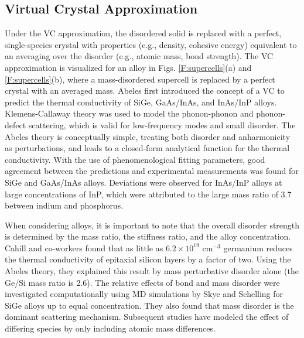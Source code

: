 \documentclass[12pt,twocolumn,iop]{/usr/share/texmf-texlive/tex/latex/iop/iopart}[/usr/share/texmf-texlive/tex/latex/iop/]
\begin{document}

\subsection{\label{S:Virtual Crystal}Virtual Crystal Approximation}

Under the VC approximation, the disordered solid is replaced with 
a perfect, single-species crystal with properties (e.g., density, 
cohesive energy) equivalent to an averaging over the disorder 
(e.g., atomic mass, bond strength).\cite{abeles_lattice_1963}
The VC approximation is visualized for an alloy in Figs. 
\ref{F:supercells}(a) and \ref{F:supercells}(b), where 
a mass-disordered supercell is replaced by a perfect 
crystal with an averaged mass. 
Abeles first introduced the concept of a VC to predict the
thermal conductivity of SiGe, GaAs/InAs, and InAs/InP alloys.
\cite{abeles_lattice_1963} Klemens-Callaway theory was used to model 
the phonon-phonon and phonon-defect scattering, 
which is valid for low-frequency modes and small disorder.
\cite{abeles_lattice_1963,klemens_scattering_1955,
klemens_thermal_1957,callaway_model_1959,mattis_phonon_1957,
kamitakahara_vibrations_1974} 
The Abeles theory is conceptually simple, treating both
disorder and anharmonicity as perturbations, and leads to 
a closed-form analytical function for the thermal conductivity.
With the use of phenomenological  
fitting parameters, good agreement between the predictions and 
experimental measurements 
was found for SiGe and GaAs/InAs alloys. Deviations were observed 
for InAs/InP alloys at large concentrations of 
InP, which were attributed to the large mass ratio of 3.7 between 
indium and phosphorus.\cite{abeles_lattice_1963}

When considering alloys, it is important to note that 
the overall disorder strength is determined by the mass ratio, 
the stiffness ratio, and the alloy concentration.
Cahill and co-workers found that as little as 
$6.2\times10^{19}$ cm$^{-3}$ germanium reduces the thermal conductivity 
of epitaxial silicon layers by a factor of two.
\cite{cahill_thermal_2004}  
Using the Abeles theory, they explained this result 
by mass perturbative disorder alone (the Ge/Si mass ratio is 2.6).
\cite{cahill_thermal_2004,cahill_thermal_2005} 
The relative effects of bond and mass disorder were investigated 
computationally using MD simulations by Skye and 
Schelling for SiGe alloys up to equal concentration.
\cite{skye_thermal_2008} They also found that mass disorder is 
the dominant scattering mechanism. Subsequent studies have modeled the 
effect of differing species by only including 
atomic mass differences.\cite{landry_thermal_2009,tian_enhancing_2012}
\end{document}
